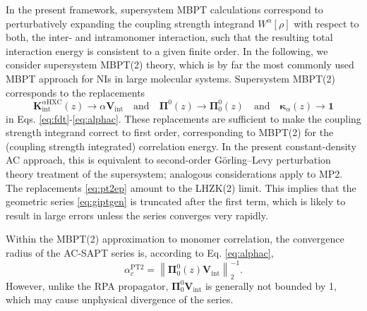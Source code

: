 \documentclass[journal=jctcce,manuscript=article]{achemso}
\begin{document}
In the present framework, supersystem MBPT calculations correspond to
perturbatively expanding the coupling strength integrand
$W^\alpha[\rho]$ with respect to 
both, the inter- and intramonomer interaction, such that the resulting
total interaction energy is consistent to a given finite
order. In the following, we consider supersystem MBPT(2) theory,
which is by far the most commonly used MBPT approach for NIs in large
molecular systems. Supersystem MBPT(2) corresponds to the replacements
\begin{equation}
  \label{eq:pt2ep}
\mathbf{K}^{\alpha\text{HXC}}_\text{int}(z)
\rightarrow \alpha \mathbf{V}_{\text{int}}\quad \text{and} \quad
\boldsymbol{\Pi}^0(z) 
\rightarrow \boldsymbol{\Pi}^0_0(z) \quad \text{and} \quad
\boldsymbol{\kappa}_{\alpha}(z) \rightarrow \mathbf{1}
\end{equation}
in Eqs. \eqref{eq:fdt}-\eqref{eq:alphac}. These replacements are
sufficient to make the coupling strength integrand correct to first
order, corresponding to MBPT(2) for the (coupling strength integrated)
correlation energy. In the present constant-density AC approach, this
is equivalent to second-order G{\"o}rling--Levy perturbation theory treatment
of the supersystem; analogous considerations apply to MP2. The replacements
\eqref{eq:pt2ep} amount to the LHZK(2) limit. This implies that the
geometric series \eqref{eq:giptgen} is truncated after the first term, which
is likely to result in large errors unless the series converges very rapidly.

Within the MBPT(2) approximation to monomer correlation, the convergence
radius of the AC-SAPT series is, according to
Eq. \eqref{eq:alphac},
\begin{equation}
  \label{eq:alphapt2}
  \alpha_c^{\text{PT2}} = \left \| \boldsymbol{\Pi}^0_{0}(z)
    \mathbf{V}_{\text{int}} \right\|_2^{-1}.
\end{equation}
However, unlike the RPA propagator,
$\boldsymbol{\Pi}_0^0\mathbf{V}_{\text{int}}$ is generally not
bounded by 1, which may cause unphysical
divergence of the series.
\end{document}
